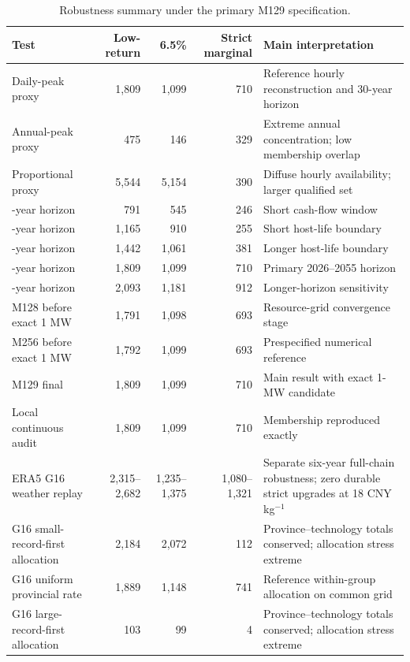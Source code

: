 \documentclass[11pt,a4paper]{article}
\begin{document}
\begin{table}[t]
\caption{Robustness summary under the primary M129 specification.}\label{tab:robustness}
\centering
\footnotesize
\begin{tabularx}{\textwidth}{>{\raggedright\arraybackslash}p{}rrr>{\raggedright\arraybackslash}X}
\toprule
Test & Low-return & 6.5\% & Strict marginal & Main interpretation \\
\midrule
Daily-peak proxy & 1,809 & 1,099 & 710 & Reference hourly reconstruction and 30-year horizon \\
Annual-peak proxy & 475 & 146 & 329 & Extreme annual concentration; low membership overlap \\
Proportional proxy & 5,544 & 5,154 & 390 & Diffuse hourly availability; larger qualified set \\
15-year horizon & 791 & 545 & 246 & Short cash-flow window \\
20-year horizon & 1,165 & 910 & 255 & Short host-life boundary \\
25-year horizon & 1,442 & 1,061 & 381 & Longer host-life boundary \\
30-year horizon & 1,809 & 1,099 & 710 & Primary 2026--2055 horizon \\
35-year horizon & 2,093 & 1,181 & 912 & Longer-horizon sensitivity \\
M128 before exact 1 MW & 1,791 & 1,098 & 693 & Resource-grid convergence stage \\
M256 before exact 1 MW & 1,792 & 1,099 & 693 & Prespecified numerical reference \\
M129 final & 1,809 & 1,099 & 710 & Main result with exact 1-MW candidate \\
Local continuous audit & 1,809 & 1,099 & 710 & Membership reproduced exactly \\
ERA5 G16 weather replay & 2,315--2,682 & 1,235--1,375 & 1,080--1,321 & Separate six-year full-chain robustness; zero durable strict upgrades at 18 CNY kg$^{-1}$ \\
G16 small-record-first allocation & 2,184 & 2,072 & 112 & Province--technology totals conserved; allocation stress extreme \\
G16 uniform provincial rate & 1,889 & 1,148 & 741 & Reference within-group allocation on common grid \\
G16 large-record-first allocation & 103 & 99 & 4 & Province--technology totals conserved; allocation stress extreme \\
\bottomrule
\end{tabularx}
\end{table}
\end{document}
